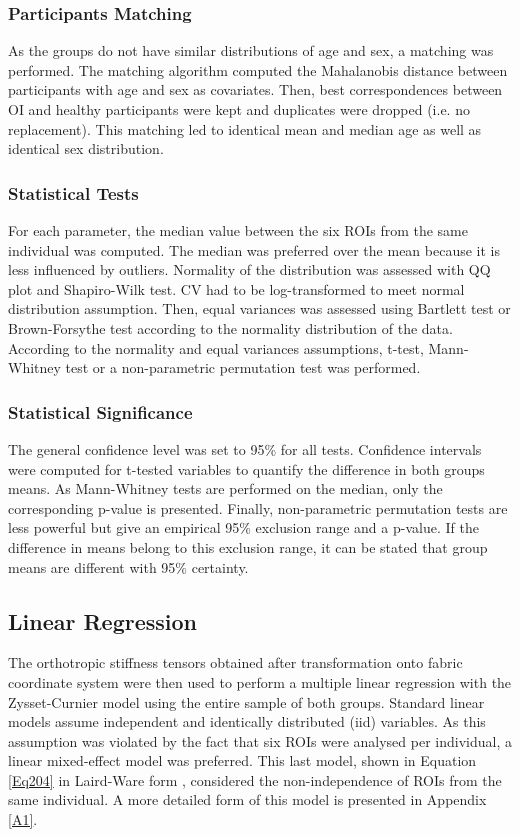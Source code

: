 \documentclass[a4paper,fleqn]{DC_ArtStyle}
\begin{document}
	\subsubsection{Participants Matching}
	As the groups do not have similar distributions of age and sex, a matching was performed. The matching algorithm computed the Mahalanobis distance between participants with age and sex as covariates. Then, best correspondences between OI and healthy participants were kept and duplicates were dropped (i.e. no replacement)\cite{Stuart2010}. This matching led to identical mean and median age as well as identical sex distribution.
	
	\subsubsection{Statistical Tests}
	For each parameter, the median value between the six ROIs from the same individual was computed. The median was preferred over the mean because it is less influenced by outliers. Normality of the distribution was assessed with QQ plot and Shapiro-Wilk test. CV had to be log-transformed to meet normal distribution assumption. Then, equal variances was assessed using Bartlett test or Brown-Forsythe test according to the normality distribution of the data. According to the normality and equal variances assumptions, t-test, Mann-Whitney test or a non-parametric permutation test was performed. 
	
	\subsubsection{Statistical Significance}
	The general confidence level was set to 95\% for all tests. Confidence intervals were computed for t-tested variables to quantify the difference in both groups means. As Mann-Whitney tests are performed on the median, only the corresponding p-value is presented. Finally, non-parametric permutation tests are less powerful but give an empirical 95\% exclusion range and a p-value. If the difference in means belong to this exclusion range, it can be stated that group means are different with 95\% certainty.
	
	\subsection{Linear Regression}
	The orthotropic stiffness tensors obtained after transformation onto fabric coordinate system were then used to perform a multiple linear regression with the Zysset-Curnier model using the entire sample of both groups. Standard linear models assume independent and identically distributed (iid) variables. As this assumption was violated by the fact that six ROIs were analysed per individual, a linear mixed-effect model was preferred. This last model, shown in Equation \ref{Eq204} in Laird-Ware form \cite{Laird1982}, considered the non-in\-de\-pen\-dence of ROIs from the same individual. A more detailed form of this model is presented in Appendix \ref{A1}.
	
\end{document}
